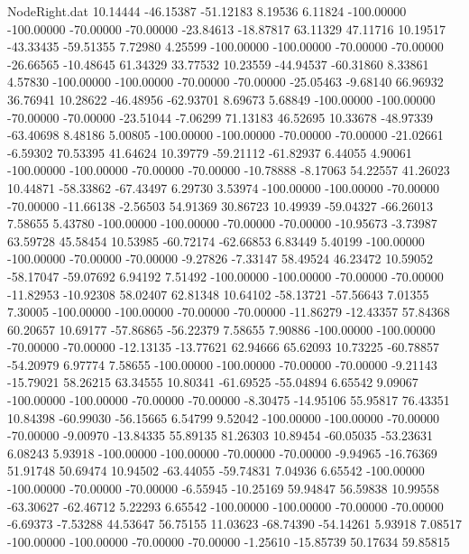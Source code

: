 \begin{filecontents}{NodeRight.dat}
  10.14444  -46.15387  -51.12183     8.19536    6.11824 -100.00000 -100.00000  -70.00000  -70.00000  -23.84613  -18.87817   63.11329   47.11716
  10.19517  -43.33435  -59.51355     7.72980    4.25599 -100.00000 -100.00000  -70.00000  -70.00000  -26.66565  -10.48645   61.34329   33.77532
  10.23559  -44.94537  -60.31860     8.33861    4.57830 -100.00000 -100.00000  -70.00000  -70.00000  -25.05463   -9.68140   66.96932   36.76941
  10.28622  -46.48956  -62.93701     8.69673    5.68849 -100.00000 -100.00000  -70.00000  -70.00000  -23.51044   -7.06299   71.13183   46.52695
  10.33678  -48.97339  -63.40698     8.48186    5.00805 -100.00000 -100.00000  -70.00000  -70.00000  -21.02661   -6.59302   70.53395   41.64624
  10.39779  -59.21112  -61.82937     6.44055    4.90061 -100.00000 -100.00000  -70.00000  -70.00000  -10.78888   -8.17063   54.22557   41.26023
  10.44871  -58.33862  -67.43497     6.29730    3.53974 -100.00000 -100.00000  -70.00000  -70.00000  -11.66138   -2.56503   54.91369   30.86723
  10.49939  -59.04327  -66.26013     7.58655    5.43780 -100.00000 -100.00000  -70.00000  -70.00000  -10.95673   -3.73987   63.59728   45.58454
  10.53985  -60.72174  -62.66853     6.83449    5.40199 -100.00000 -100.00000  -70.00000  -70.00000   -9.27826   -7.33147   58.49524   46.23472
  10.59052  -58.17047  -59.07692     6.94192    7.51492 -100.00000 -100.00000  -70.00000  -70.00000  -11.82953  -10.92308   58.02407   62.81348
  10.64102  -58.13721  -57.56643     7.01355    7.30005 -100.00000 -100.00000  -70.00000  -70.00000  -11.86279  -12.43357   57.84368   60.20657
  10.69177  -57.86865  -56.22379     7.58655    7.90886 -100.00000 -100.00000  -70.00000  -70.00000  -12.13135  -13.77621   62.94666   65.62093
  10.73225  -60.78857  -54.20979     6.97774    7.58655 -100.00000 -100.00000  -70.00000  -70.00000   -9.21143  -15.79021   58.26215   63.34555
  10.80341  -61.69525  -55.04894     6.65542    9.09067 -100.00000 -100.00000  -70.00000  -70.00000   -8.30475  -14.95106   55.95817   76.43351
  10.84398  -60.99030  -56.15665     6.54799    9.52042 -100.00000 -100.00000  -70.00000  -70.00000   -9.00970  -13.84335   55.89135   81.26303
  10.89454  -60.05035  -53.23631     6.08243    5.93918 -100.00000 -100.00000  -70.00000  -70.00000   -9.94965  -16.76369   51.91748   50.69474
  10.94502  -63.44055  -59.74831     7.04936    6.65542 -100.00000 -100.00000  -70.00000  -70.00000   -6.55945  -10.25169   59.94847   56.59838
  10.99558  -63.30627  -62.46712     5.22293    6.65542 -100.00000 -100.00000  -70.00000  -70.00000   -6.69373   -7.53288   44.53647   56.75155
  11.03623  -68.74390  -54.14261     5.93918    7.08517 -100.00000 -100.00000  -70.00000  -70.00000   -1.25610  -15.85739   50.17634   59.85815

\end{filecontents}
